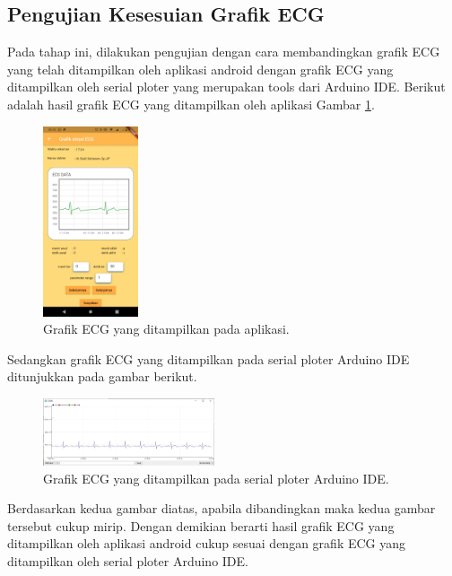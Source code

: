\documentclass[conference]{IEEEtran}
\begin{document}
	\vspace{1ex}
	\subsection{Pengujian Kesesuian Grafik ECG}
	\vspace{1ex}
	
	Pada tahap ini, dilakukan pengujian dengan cara membandingkan grafik ECG yang telah ditampilkan oleh aplikasi android dengan grafik ECG yang ditampilkan oleh serial ploter yang merupakan tools dari Arduino IDE. Berikut adalah hasil grafik ECG yang ditampilkan oleh aplikasi Gambar \ref{fig:4.0}.
	
	\begin{figure}[h] \centering
		\includegraphics[width=0.25\textwidth]{img/grafikECGapps.jpg}
		\caption{Grafik ECG yang ditampilkan pada aplikasi.}
		\label{fig:4.0}
	\end{figure}
	Sedangkan grafik ECG yang ditampilkan pada serial ploter Arduino IDE ditunjukkan pada gambar berikut.
	\begin{figure}[h] \centering
		\includegraphics[width=0.45\textwidth]{img/ujisesuaidataIDE.jpg}
		\caption{Grafik ECG yang ditampilkan pada serial ploter Arduino IDE.}
		\label{fig:4.1}
	\end{figure}
	
	Berdasarkan kedua gambar diatas, apabila dibandingkan maka kedua gambar tersebut cukup mirip. Dengan demikian berarti hasil grafik ECG yang ditampilkan oleh aplikasi android cukup sesuai dengan grafik ECG yang ditampilkan oleh serial ploter Arduino IDE.
	\vspace{1ex}
\end{document}
